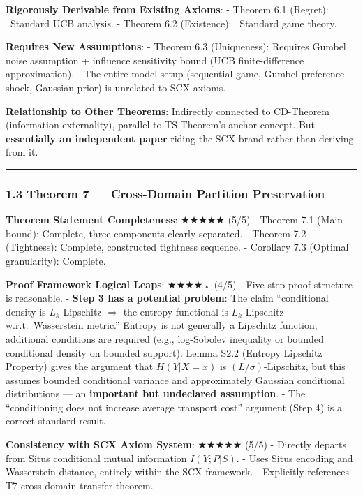 \documentclass[
  12pt,
]{article}
\begin{document}
\textbf{Rigorously Derivable from Existing Axioms}:
- Theorem 6.1 (Regret): \checkmark\ Standard UCB analysis.
- Theorem 6.2 (Existence): \checkmark\ Standard game theory.

\textbf{Requires New Assumptions}:
- Theorem 6.3 (Uniqueness): Requires Gumbel noise assumption + influence sensitivity bound (UCB finite-difference approximation).
- The entire model setup (sequential game, Gumbel preference shock, Gaussian prior) is unrelated to SCX axioms.

\textbf{Relationship to Other Theorems}: Indirectly connected to CD-Theorem (information externality), parallel to TS-Theorem's anchor concept. But \textbf{essentially an independent paper} riding the SCX brand rather than deriving from it.

\begin{center}\rule{0.5\linewidth}{0.5pt}\end{center}

\subsubsection{1.3 Theorem 7 --- Cross-Domain Partition Preservation}\label{theorem-7-cross-domain-partition-preservation}

\textbf{Theorem Statement Completeness}: $\bigstar\bigstar\bigstar\bigstar\bigstar$ (5/5)
- Theorem 7.1 (Main bound): Complete, three components clearly separated.
- Theorem 7.2 (Tightness): Complete, constructed tightness sequence.
- Corollary 7.3 (Optimal granularity): Complete.

\textbf{Proof Framework Logical Leaps}: $\bigstar\bigstar\bigstar\bigstar{\scriptstyle\star}$ (4/5)
- Five-step proof structure is reasonable.
- \textbf{Step 3 has a potential problem}: The claim ``conditional density is $L_k$-Lipschitz $\Rightarrow$ the entropy functional is $L_k$-Lipschitz w.r.t.\ Wasserstein metric.'' Entropy is not generally a Lipschitz function; additional conditions are required (e.g., log-Sobolev inequality or bounded conditional density on bounded support). Lemma S2.2 (Entropy Lipschitz Property) gives the argument that $H(Y|X=x)$ is $(L/\sigma)$-Lipschitz, but this assumes bounded conditional variance and approximately Gaussian conditional distributions --- an \textbf{important but undeclared assumption}.
- The ``conditioning does not increase average transport cost'' argument (Step 4) is a correct standard result.

\textbf{Consistency with SCX Axiom System}: $\bigstar\bigstar\bigstar\bigstar\bigstar$ (5/5)
- Directly departs from Situs conditional mutual information $I(Y;P|S)$.
- Uses Situs encoding and Wasserstein distance, entirely within the SCX framework.
- Explicitly references T7 cross-domain transfer theorem.
\end{document}
